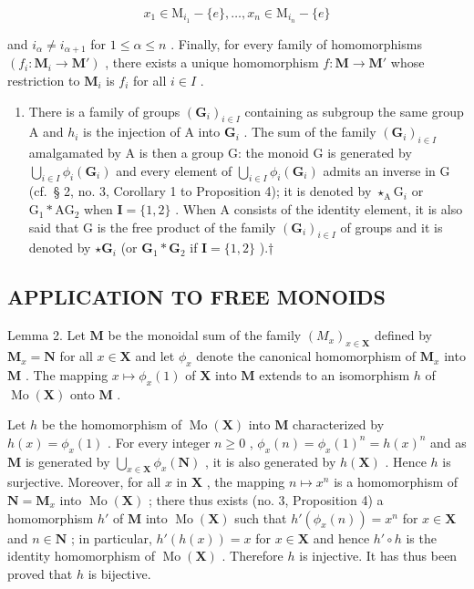 \[
x _ {1} \in \mathrm{M} _ {i _ {1}} - \{e \}, \dots , x _ {n} \in \mathrm{M} _ {i _ {n}} - \{e \}
\]

and \(i_{\alpha} \neq i_{\alpha + 1}\) for \(1 \leqslant \alpha \leqslant n\) . Finally, for every family of homomorphisms \((f_i: \mathbf{M}_i \to \mathbf{M}')\) , there exists a unique homomorphism \(f: \mathbf{M} \to \mathbf{M}'\) whose restriction to \(\mathbf{M}_i\) is \(f_i\) for all \(i \in I\) .

\begin{enumerate}
\def\labelenumi{(\alph{enumi})}
\setcounter{enumi}{1}
\tightlist
\item
  There is a family of groups \((\mathbf{G}_i)_{i\in I}\) containing as subgroup the same group A and \(h_i\) is the injection of A into \(\mathbf{G}_i\) . The sum of the family \((\mathbf{G}_i)_{i\in I}\) amalgamated by A is then a group G: the monoid G is generated by \(\bigcup_{i\in I}\phi_i(\mathbf{G}_i)\) and every element of \(\bigcup_{i\in I}\phi_i(\mathbf{G}_i)\) admits an inverse in G (cf.~§ 2, no. 3, Corollary 1 to Proposition 4); it is denoted by \(\star_{\mathrm{A}}\mathrm{G}_{i}\) or \(\mathrm{G}_{1}*\mathrm{A}\mathrm{G}_{2}\) when \(\mathbf{I} = \{1,2\}\) . When A consists of the identity element, it is also said that G is the free product of the family \((\mathbf{G}_i)_{i\in I}\) of groups and it is denoted by \(\star \mathbf{G}_i\) (or \(\mathbf{G}_1*\mathbf{G}_2\) if \(\mathbf{I} = \{1,2\}\) ).†
\end{enumerate}

\subsection{APPLICATION TO FREE MONOIDS}

Lemma 2. Let \(\mathbf{M}\) be the monoidal sum of the family \((M_x)_{x\in \mathbf{X}}\) defined by \(\mathbf{M}_x = \mathbf{N}\) for all \(x\in \mathbf{X}\) and let \(\phi_{x}\) denote the canonical homomorphism of \(\mathbf{M}_x\) into \(\mathbf{M}\) . The mapping \(x\mapsto \phi_x(1)\) of \(\mathbf{X}\) into \(\mathbf{M}\) extends to an isomorphism \(h\) of \(\operatorname {Mo}(\mathbf{X})\) onto \(\mathbf{M}\) .

Let \(h\) be the homomorphism of \(\operatorname{Mo}(\mathbf{X})\) into \(\mathbf{M}\) characterized by \(h(x) = \phi_x(1)\) . For every integer \(n \geqslant 0\) , \(\phi_x(n) = \phi_x(1)^n = h(x)^n\) and as \(\mathbf{M}\) is generated by \(\bigcup_{x \in \mathbf{X}} \phi_x(\mathbf{N})\) , it is also generated by \(h(\mathbf{X})\) . Hence \(h\) is surjective. Moreover, for all \(x\) in \(\mathbf{X}\) , the mapping \(n \mapsto x^n\) is a homomorphism of \(\mathbf{N} = \mathbf{M}_x\) into \(\operatorname{Mo}(\mathbf{X})\) ; there thus exists (no. 3, Proposition 4) a homomorphism \(h'\) of \(\mathbf{M}\) into \(\operatorname{Mo}(\mathbf{X})\) such that \(h'(\phi_x(n)) = x^n\) for \(x \in \mathbf{X}\) and \(n \in \mathbf{N}\) ; in particular, \(h'(h(x)) = x\) for \(x \in \mathbf{X}\) and hence \(h' \circ h\) is the identity homomorphism of \(\operatorname{Mo}(\mathbf{X})\) . Therefore \(h\) is injective. It has thus been proved that \(h\) is bijective.


